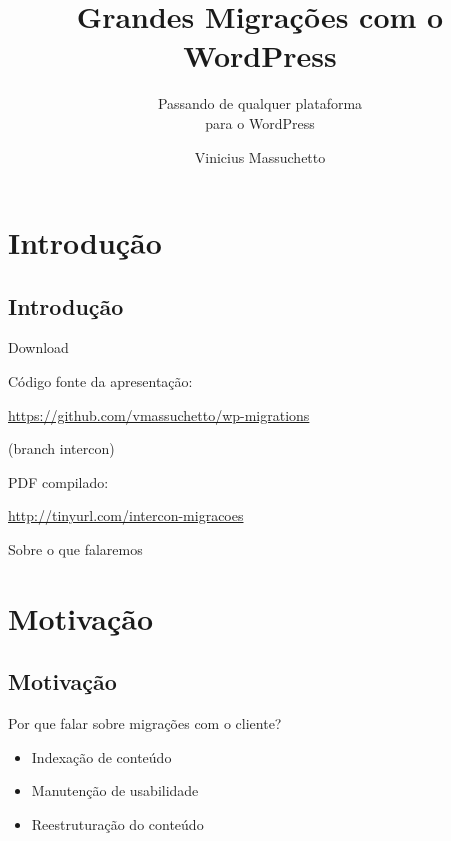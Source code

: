 \documentclass{beamer}
\title{Grandes Migrações com o WordPress}
\subtitle{Passando de qualquer plataforma \\
  para o WordPress}
\author{Vinicius Massuchetto}
\date{}
\begin{document}
\frame{\titlepage}

\section{Introdução}
\subsection{Introdução}

\begin{frame}{Download}
  \begin{center}

    Código fonte da apresentação:

    \vspace{0.1cm}

    \url{https://github.com/vmassuchetto/wp-migrations}

    \vspace{0.1cm}

    \footnotesize{(branch intercon)}

    \vspace{1cm}

    PDF compilado:

    \vspace{0.1cm}

    \url{http://tinyurl.com/intercon-migracoes}

  \end{center}
\end{frame}

\begin{frame}{Sobre o que falaremos}
  \tableofcontents[subsectionstyle=hide]
\end{frame}

\section{Motivação}
\subsection{Motivação}

\begin{frame}{Por que falar sobre migrações com o cliente?}
\begin{itemize}
  \pause \item Indexação de conteúdo
  \pause \item Manutenção de usabilidade
  \pause \item Reestruturação do conteúdo
\end{itemize}
\end{frame}
\end{document}
